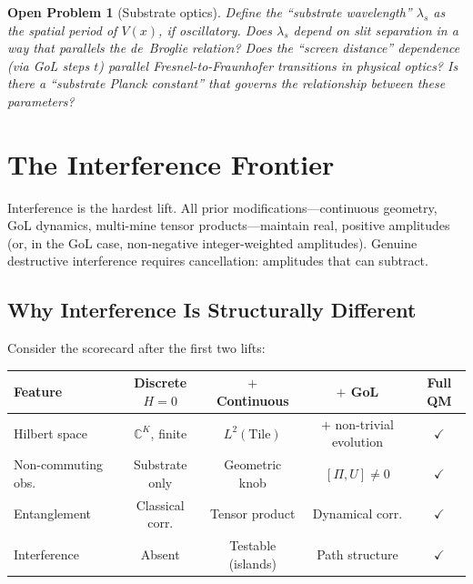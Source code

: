 \documentclass[12pt,a4paper]{article}
\newtheorem{openproblem}[theorem]{Open Problem}
\theoremstyle{definition}
\theoremstyle{remark}
\newcommand{\C}{\mathbb{C}}
\begin{document}
\begin{openproblem}[Substrate optics]
\label{op:optics}
Define the ``substrate wavelength'' $\lambda_s$ as the spatial period of $V(x)$, if oscillatory.  Does $\lambda_s$ depend on slit separation in a way that parallels the de~Broglie relation?  Does the ``screen distance'' dependence (via GoL steps $t$) parallel Fresnel-to-Fraunhofer transitions in physical optics?  Is there a ``substrate Planck constant'' that governs the relationship between these parameters?
\end{openproblem}


\section{The Interference Frontier}
\label{sec:interference-frontier}

Interference is the hardest lift.  All prior modifications---continuous geometry, GoL dynamics, multi-mine tensor products---maintain real, positive amplitudes (or, in the GoL case, non-negative integer-weighted amplitudes).  Genuine destructive interference requires cancellation: amplitudes that can subtract.

\subsection{Why Interference Is Structurally Different}

Consider the scorecard after the first two lifts:

\begin{center}
\begin{tabular}{@{}lcccc@{}}
\toprule
\textbf{Feature} & \textbf{Discrete $H{=}0$} & \textbf{$+$ Continuous} & \textbf{$+$ GoL} & \textbf{Full QM} \\
\midrule
Hilbert space       & $\C^K$, finite        & $L^2(\text{Tile})$    & $+$ non-trivial evolution & $\checkmark$ \\
Non-commuting obs.  & Substrate only        & Geometric knob        & $[\Pi, U] \neq 0$        & $\checkmark$ \\
Entanglement        & Classical corr.       & Tensor product        & Dynamical corr.          & $\checkmark$ \\
Interference        & Absent                & Testable (islands)    & Path structure            & $\checkmark$ \\
\bottomrule
\end{tabular}
\end{center}
\end{document}
